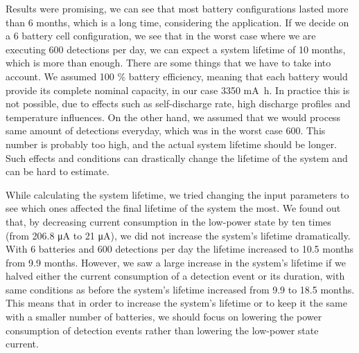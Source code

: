 Results were promising, we can see that most battery configurations lasted more than 6 months, which is a long time, considering the application.
If we decide on a 6 battery cell configuration, we see that in the worst case where we are executing 600 detections per day, we can expect a system lifetime of 10 months, which is more than enough.
There are some things that we have to take into account.
We assumed 100 \% battery efficiency, meaning that each battery would provide its complete nominal capacity, in our case 3350 \si{\milli\ampere\hour}.
In practice this is not possible, due to effects such as self-discharge rate, high discharge profiles and temperature influences.
On the other hand, we assumed that we would process same amount of detections everyday, which was in the worst case 600.
This number is probably too high, and the actual system lifetime should be longer.
Such effects and conditions can drastically change the lifetime of the system and can be hard to estimate.

While calculating the system lifetime, we tried changing the input parameters to see which ones affected the final lifetime of the system the most.
We found out that, by decreasing current consumption in the low-power state by ten times (from 206.8 \si{\micro\ampere} to 21 \si{\micro\ampere}), we did not increase the system's lifetime dramatically.
With 6 batteries and 600 detections per day the lifetime increased to 10.5 months from 9.9 months.
However, we saw a large increase in the system's lifetime if we halved either the current consumption of a detection event or its duration, with same conditions as before the system's lifetime increased from 9.9 to 18.5 months.
This means that in order to increase the system's lifetime or to keep it the same with a smaller number of batteries, we should focus on lowering the power consumption of detection events rather than lowering the low-power state current.
